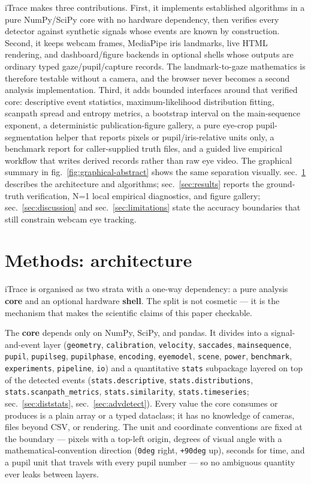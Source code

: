 \documentclass[
]{article}
\begin{document}
iTrace makes three contributions. First, it implements established
algorithms in a pure NumPy/SciPy core with no hardware dependency, then
verifies every detector against synthetic signals whose events are known
by construction. Second, it keeps webcam frames, MediaPipe iris
landmarks, live HTML rendering, and dashboard/figure backends in
optional shells whose outputs are ordinary typed gaze/pupil/capture
records. The landmark-to-gaze mathematics is therefore testable without
a camera, and the browser never becomes a second analysis
implementation. Third, it adds bounded interfaces around that verified
core: descriptive event statistics, maximum-likelihood distribution
fitting, scanpath spread and entropy metrics, a bootstrap interval on
the main-sequence exponent, a deterministic publication-figure gallery,
a pure eye-crop pupil-segmentation helper that reports pixels or
pupil/iris-relative units only, a benchmark report for caller-supplied
truth files, and a guided live empirical workflow that writes derived
records rather than raw eye video. The graphical summary in
fig.~\ref{fig:graphical-abstract} shows the same separation visually.
sec.~\ref{sec:methods} describes the architecture and algorithms;
sec.~\ref{sec:results} reports the ground-truth verification, N=1 local
empirical diagnostics, and figure gallery; sec.~\ref{sec:discussion} and
sec.~\ref{sec:limitations} state the accuracy boundaries that still
constrain webcam eye tracking.

\section{Methods: architecture}\label{sec:methods}

iTrace is organised as two strata with a one-way dependency: a pure
analysis \textbf{core} and an optional hardware \textbf{shell}. The
split is not cosmetic --- it is the mechanism that makes the scientific
claims of this paper checkable.

The \textbf{core} depends only on NumPy, SciPy, and pandas. It divides
into a signal-and-event layer (\texttt{geometry}, \texttt{calibration},
\texttt{velocity}, \texttt{saccades}, \texttt{mainsequence},
\texttt{pupil}, \texttt{pupilseg}, \texttt{pupilphase},
\texttt{encoding}, \texttt{eyemodel}, \texttt{scene}, \texttt{power},
\texttt{benchmark}, \texttt{experiments}, \texttt{pipeline},
\texttt{io}) and a quantitative \texttt{stats} subpackage layered on top
of the detected events (\texttt{stats.descriptive},
\texttt{stats.distributions}, \texttt{stats.scanpath\_metrics},
\texttt{stats.similarity}, \texttt{stats.timeseries};
sec.~\ref{sec:diststats}, sec.~\ref{sec:advdetect}). Every value the
core consumes or produces is a plain array or a typed dataclass; it has
no knowledge of cameras, files beyond CSV, or rendering. The unit and
coordinate conventions are fixed at the boundary --- pixels with a
top-left origin, degrees of visual angle with a mathematical-convention
direction (\texttt{0deg} right, \texttt{+90deg} up), seconds for time,
and a pupil unit that travels with every pupil number --- so no
ambiguous quantity ever leaks between layers.
\end{document}
